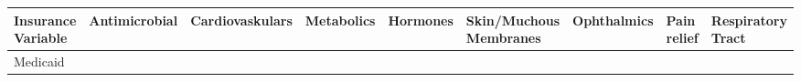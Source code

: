 \documentclass[
]{book}
\begin{document}
\begin{longtable}[]{@{}lllllllll@{}}
\toprule
\begin{minipage}[b]{0.10\columnwidth}\raggedright
Insurance Variable\strut
\end{minipage} & \begin{minipage}[b]{0.08\columnwidth}\raggedright
Antimicrobial\strut
\end{minipage} & \begin{minipage}[b]{0.09\columnwidth}\raggedright
Cardiovaskulars\strut
\end{minipage} & \begin{minipage}[b]{0.07\columnwidth}\raggedright
Metabolics\strut
\end{minipage} & \begin{minipage}[b]{0.06\columnwidth}\raggedright
Hormones\strut
\end{minipage} & \begin{minipage}[b]{0.11\columnwidth}\raggedright
Skin/Muchous Membranes\strut
\end{minipage} & \begin{minipage}[b]{0.07\columnwidth}\raggedright
Ophthalmics\strut
\end{minipage} & \begin{minipage}[b]{0.07\columnwidth}\raggedright
Pain relief\strut
\end{minipage} & \begin{minipage}[b]{0.10\columnwidth}\raggedright
Respiratory Tract\strut
\end{minipage}\tabularnewline
\midrule
\endhead
\begin{minipage}[t]{0.10\columnwidth}\raggedright
Medicaid\strut
\end{minipage} & \begin{minipage}[t]{0.08\columnwidth}\raggedright
\strut
\end{minipage} & \begin{minipage}[t]{0.09\columnwidth}\raggedright
\strut
\end{minipage} & \begin{minipage}[t]{0.07\columnwidth}\raggedright
\strut
\end{minipage} & \begin{minipage}[t]{0.06\columnwidth}\raggedright
\strut
\end{minipage} & \begin{minipage}[t]{0.11\columnwidth}\raggedright
\strut
\end{minipage} & \begin{minipage}[t]{0.07\columnwidth}\raggedright

\end{minipage}
\end{longtable}
\end{document}

